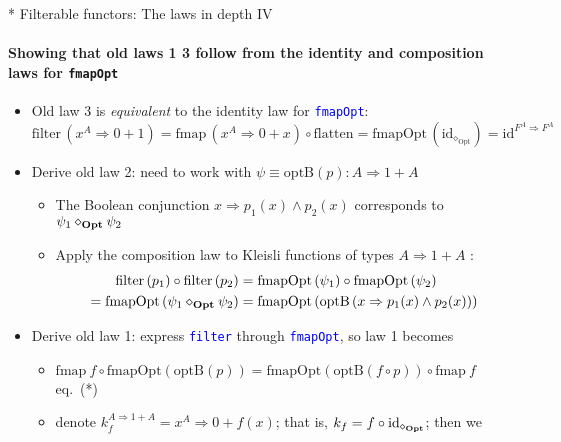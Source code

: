 \documentclass[english]{beamer}
\begin{document}
\begin{frame}{{*} Filterable functors: The laws in depth IV}


\framesubtitle{Showing that old laws 1 \textendash{} 3 follow from the identity
and composition laws for \texttt{\footnotesize{}fmapOpt}}
\begin{itemize}
\item Old law 3 is \emph{equivalent} to the identity law for \texttt{\textcolor{blue}{\footnotesize{}fmapOpt}}:{\footnotesize{}
\[
\text{filter}\,(x^{A}\Rightarrow0+1)=\text{fmap}\,(x^{A}\Rightarrow0+x)\circ\text{flatten}=\text{fmapOpt}\,(\text{id}_{\diamond_{\text{Opt}}})=\text{id}^{F^{A}\Rightarrow F^{A}}
\]
}{\footnotesize \par}
\item Derive old law 2: need to work with{\footnotesize{} $\psi\equiv\text{optB}\left(p\right):A\Rightarrow1+A$ }{\footnotesize \par}
\begin{itemize}
\item The Boolean conjunction $x\Rightarrow p_{1}(x)\wedge p_{2}(x)$ corresponds
to $\psi_{1}\diamond_{\text{\textbf{Opt}}}\psi_{2}$
\item Apply the composition law to Kleisli functions of types $A\Rightarrow1+A${\footnotesize{}
}:{\footnotesize{}
\begin{align*}
\text{filter}\left(p_{1}\right)\circ\text{filter}\left(p_{2}\right) & =\text{fmapOpt}\left(\psi_{1}\right)\circ\text{fmapOpt}\left(\psi_{2}\right)\\
=\text{fmapOpt}\left(\psi_{1}\diamond_{\text{\textbf{Opt}}}\psi_{2}\right) & =\text{fmapOpt}\left(\text{optB}\left(x\Rightarrow p_{1}(x)\wedge p_{2}(x)\right)\right)
\end{align*}
}{\footnotesize \par}
\end{itemize}
\item Derive old law 1: express \texttt{\textcolor{blue}{\footnotesize{}filter}}
through \texttt{\textcolor{blue}{\footnotesize{}fmapOpt}}, so law
1 becomes
\begin{itemize}
\item {\footnotesize{}$\text{fmap}\:f\circ\text{fmapOpt}\left(\text{optB}\left(p\right)\right)=\text{fmapOpt}\left(\text{optB}\left(f\circ p\right)\right)\circ\text{fmap}\:f$
\textendash{} eq.\ ({*})}{\footnotesize \par}
\item denote $k_{f}^{A\Rightarrow1+A}=x^{A}\Rightarrow0+f(x)$; that is,
$k_{f}=f\circ\text{id}_{\diamond_{\text{\textbf{Opt}}}}$; then we

\end{itemize}
\end{itemize}
\end{frame}
\end{document}

